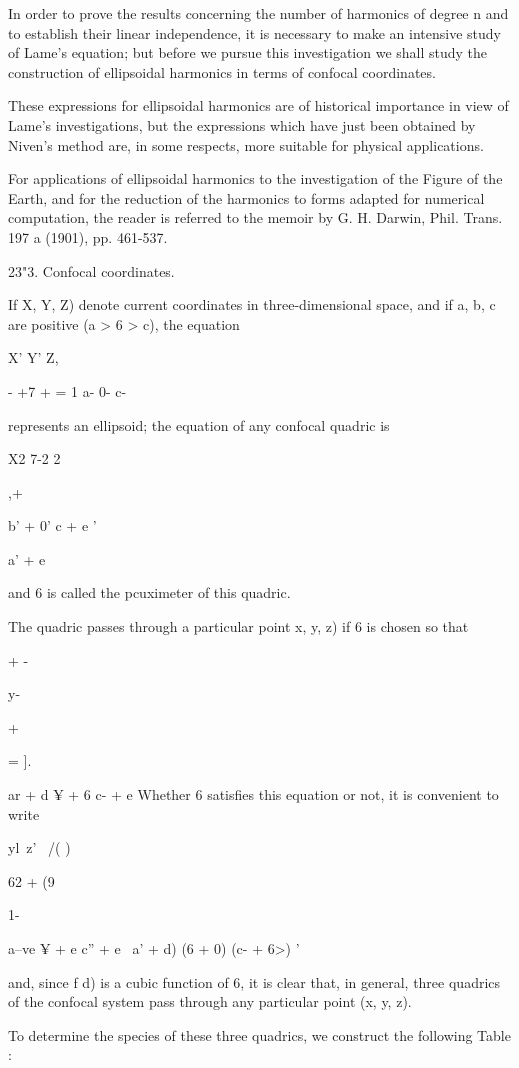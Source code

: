 {{In order to prove the results concerning the number of harmonics of
degree n and to establish their linear independence, it is necessary
to make an intensive study of Lame's equation; but before we pursue
this investigation we shall study the construction of ellipsoidal
harmonics in terms of confocal coordinates.

%
%

These expressions for ellipsoidal harmonics are of historical
importance in view of Lame's investigations, but the expressions which
have just been obtained by Niven's method are, in some respects, more
suitable for physical applications.

For applications of ellipsoidal harmonics to the investigation of the
Figure of the Earth, and for the reduction of the harmonics to forms
adapted for numerical computation, the reader is referred to the
memoir by G. H. Darwin, Phil. Trans. 197 a (1901), pp. 461-537.

23"3. Confocal coordinates.

If X, Y, Z) denote current coordinates in three-dimensional space, and
if a, b, c are positive (a > 6 > c), the equation

X' Y' Z,

- +7 + = 1 a- 0- c-

represents an ellipsoid; the equation of any confocal quadric is

X2 7-2 2

,+

b' + 0' c + e '

a' + e

and 6 is called the pcuximeter of this quadric.

The quadric passes through a particular point x, y, z) if 6 is chosen
so that

+ -

y-

+

= ].

ar + d ¥ + 6 c- + e Whether 6 satisfies this equation or not, it is
convenient to write

  yl\ z' \ /( )

62 + (9

1-

a--ve ¥ + e c'' + e~ a' + d) (6 + 0) (c- + 6>) '

and, since f d) is a cubic function of 6, it is clear that, in
general, three quadrics of the confocal system pass through any
particular point (x, y, z).

To determine the species of these three quadrics, we construct the
following Table :

}}
